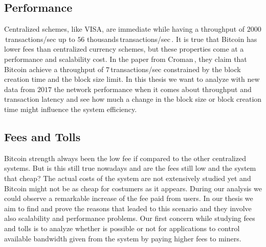 \documentclass[USenglish]{uit-thesis}
\begin{document}
\subsection{Performance}
Centralized schemes, like VISA, are immediate while having a
throughput of $2000$\,transactions/sec
up to $56$ thousands\,transactions/sec\,\cite{croman2016}.
It is true that Bitcoin has lower fees than centralized
currency schemes, but these properties
come at a performance and scalability cost.
In the paper from Croman\,\cite{croman2016}, they
claim that Bitcoin achieve a throughput of
$7$\,transactions/sec constrained by the block
creation time and the block size limit.
In this thesis we want to analyze with
new data from $2017$ the network
performance when it comes about
throughput and transaction latency
and see how much a change in the block size
or block creation time might
influence the system efficiency.

\subsection{Fees and Tolls}
Bitcoin strength always been the low fee
if compared
to the other centralized systems.
But is this still
true nowadays and are the fees still
low and the system that cheap?
The actual costs of the system
are not extensively studied yet and Bitcoin might
not be as cheap for costumers as it appears.
During our analysis we could observe a remarkable increase
of the fee paid from users. In our thesis we aim
to find and prove the reasons that leaded to this
scenario and they involve also scalability and
performance problems.
Our first concern while studying fees and tolls
is to analyze whether is possible or not
for applications to control available
bandwidth given from the system by paying
higher fees to miners.

\end{document}
